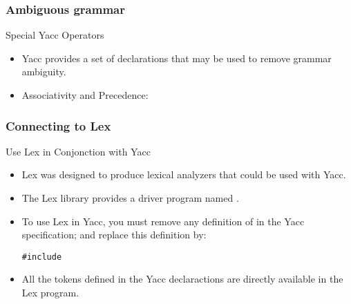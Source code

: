 \begin{bibunit}[apalike]
\subsubsection{Ambiguous grammar}

\tableofcontentslide[sectionstyle={show/shaded},subsectionstyle={show/shaded/hide},subsubsectionstyle={show/shaded/hide/hide}]

\begin{frame}{Special Yacc Operators}
	\begin{itemize}
	\item Yacc provides a set of declarations that may be used to remove grammar ambiguity.
	\vfill
	\item Associativity and Precedence:
	\end{itemize}
\end{frame}

\subsubsection{Connecting to Lex}

\tableofcontentslide[sectionstyle={show/shaded},subsectionstyle={show/shaded/hide},subsubsectionstyle={show/shaded/hide/hide}]

\begin{frame}{Use Lex in Conjonction with Yacc}
	\begin{itemize}
	\item Lex was designed to produce lexical analyzers that could be used with Yacc.
	\vfill
	\item The Lex library provides a driver program named .
	\vfill
	\item To use Lex in Yacc, you must remove any definition of in the Yacc specification; and replace this definition by:
		\begin{center}
		\texttt{\#include }
		\end{center}
	\vfill
	\item All the tokens defined in the Yacc declaractions are directly available in the Lex program.
	\end{itemize}
\end{frame}


\end{bibunit}
